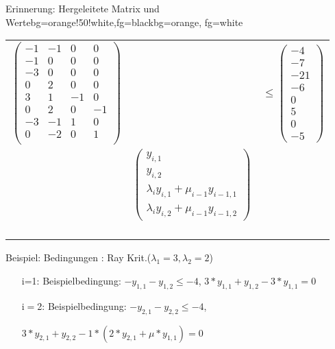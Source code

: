 \begin{frame}
	\begin{variableblock}{Erinnerung: Hergeleitete Matrix und Werte}{bg=orange!50!white,fg=black}{bg=orange, fg=white}
	\begin{tabular}{rll}
		\multirow{2}{*}{$\begin{pmatrix}
			-1 		& -1 		&  0		& 0		 \\
			-1 		& 0 		&  0		& 0		 \\
			-3 		& 0 		&  0		& 0		 \\
			0 		& 2 		&  0		& 0		 \\
			3 		& 1 		&  -1		& 0		 \\
			0 		& 2 		&  0		& -1	 \\
			-3 		& -1 		&  1		& 0		 \\
			0 		& -2 		&  0		& 1	 	 \\
			\end{pmatrix}$}& &\multirow{2}{*}{$ \le \begin{pmatrix}
			-4 \\ -7 \\ -21 \\ -6 \\ 0 \\ 5 \\ 0 \\ -5
			\end{pmatrix} $}\\
		& & \\
		& \multirow{2}{*}{$\begin{pmatrix}
			y_{i,1} \\ y_{i,2} \\ \lambda_iy_{i,1}+\mu_{i-1}y_{i-1,1} \\ \lambda_iy_{i,2}+\mu_{i-1}y_{i-1,2}
			\end{pmatrix} $} & \\
		& & \\
		& & \\
		& & \\
		& & \\
		& & \\
	\end{tabular}
	\end{variableblock}
	\vspace*{-.5em}
	\begin{exampleblock}{Beispiel: Bedingungen : Ray Krit.($\lambda_1 = 3,\lambda_2 = 2$) }
		\begin{itemize}
			\setlength{\itemindent}{0.25cm}
			\item[i=1:] Beispielbedingung: $-y_{1,1}-y_{1,2} \le -4$, $3*y_{1,1}+y_{1,2}-3*y_{1,1}=0$
			\item[i$=$2:] Beispielbedingung: $-y_{2,1}-y_{2,2} \le -4$, 
			\item[] $3*y_{2,1}+y_{2,2}-1*(2*y_{2,1}+\mu*y_{1,1})=0$
		\end{itemize}
	\end{exampleblock}
\end{frame}




